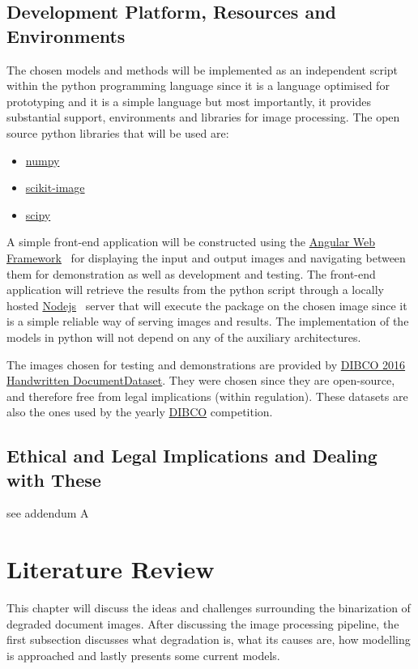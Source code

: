 \documentclass[a4paper, 12pt]{report}
\begin{document}
\section{Development Platform, Resources and Environments}
The chosen models and methods will be implemented as an independent script within the python programming language since it is a language optimised for prototyping and it is a simple language but most importantly, it provides substantial support, environments and libraries for image processing. The open source python libraries that will be used are:
\begin{itemize}
    \item \href{https://numpy.org/}{numpy}~\cite{numpy}
    \item \href{https://scikit-image.org/}{scikit-image}~\cite{scikit-image}
    \item \href{https://scikit-image.org/}{scipy}~\cite{2020SciPy-NMeth}
\end{itemize}

A simple front-end application will be constructed using the \href{https://angular.io/}{Angular Web Framework}~\cite{angular_2022} for displaying the input and output images and navigating between them for demonstration as well as development and testing. The front-end application will retrieve the results from the python script through a locally hosted \href{https://nodejs.org/en/}{Nodejs}~\cite{nodejs_2022} server that will execute the package on the chosen image since it is a simple reliable way of serving images and results. The implementation of the models in python will not depend on any of the auxiliary architectures. \par

The images chosen for testing and demonstrations are provided by \href{https://vc.ee.duth.gr/h-dibco2016/}{DIBCO 2016 Handwritten DocumentDataset}. They were chosen since they are open-source, and therefore free from legal implications (within regulation). These datasets are also the ones used by the yearly \href{https://dib.cin.ufpe.br/#!/resources/dibco}{DIBCO} competition.

\section{Ethical and Legal Implications and Dealing with These}
see addendum A

\chapter{Literature Review}
This chapter will discuss the ideas and challenges surrounding the binarization of degraded document images. After discussing the image processing pipeline, the first subsection discusses what degradation is, what its causes are, how modelling is approached and lastly presents some current models.
\end{document}
